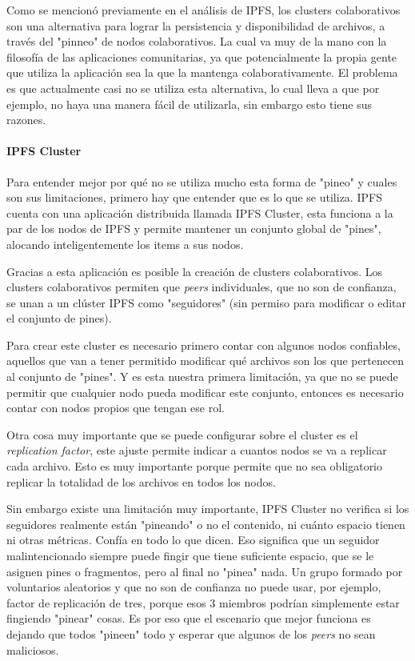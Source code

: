 Como se mencionó previamente en el análisis de IPFS, los clusters colaborativos son una alternativa para lograr la persistencia y disponibilidad de archivos, a través del "pinneo" de nodos colaborativos. La cual va muy de la mano con la filosofía de las aplicaciones comunitarias, ya que potencialmente la propia gente que utiliza la aplicación sea la que la mantenga colaborativamente. El problema es que actualmente casi no se utiliza esta alternativa, lo cual lleva a que por ejemplo, no haya una manera fácil de utilizarla, sin embargo esto tiene sus razones.

\paragraph{IPFS Cluster}

Para entender mejor por qué no se utiliza mucho esta forma de "pineo" y cuales son sus limitaciones, primero hay que entender que es lo que se utiliza. IPFS cuenta con una aplicación distribuida llamada IPFS Cluster, esta funciona a la par de los nodos de IPFS y permite mantener un conjunto global de "pines", alocando inteligentemente los items a sus nodos.

Gracias a esta aplicación es posible la creación de clusters colaborativos. Los clusters colaborativos permiten que \textit{peers} individuales, que no son de confianza, se unan a un clúster IPFS como "seguidores" (sin permiso para modificar o editar el conjunto de pines).

Para crear este cluster es necesario primero contar con algunos nodos confiables, aquellos que van a tener permitido modificar qué archivos son los que pertenecen al conjunto de "pines". Y es esta nuestra primera limitación, ya que no se puede permitir que cualquier nodo pueda modificar este conjunto, entonces es necesario contar con nodos propios que tengan ese rol.

Otra cosa muy importante que se puede configurar sobre el cluster es el \textit{replication factor}, este ajuste permite indicar a cuantos nodos se va a replicar cada archivo. Esto es muy importante porque permite que no sea obligatorio replicar la totalidad de los archivos en todos los nodos. 

Sin embargo existe una limitación muy importante, IPFS Cluster no verifica si los seguidores realmente están "pineando" o no el contenido, ni cuánto espacio tienen ni otras métricas. Confía en todo lo que dicen. Eso significa que un seguidor malintencionado siempre puede fingir que tiene suficiente espacio, que se le asignen pines o fragmentos, pero al final no "pinea" nada. Un grupo formado por voluntarios aleatorios y que no son de confianza no puede usar, por ejemplo, factor de replicación de tres, porque esos 3 miembros podrían simplemente estar fingiendo "pinear" cosas. Es por eso que el escenario que mejor funciona es dejando que todos "pineen" todo y esperar que algunos de los \textit{peers} no sean maliciosos.

